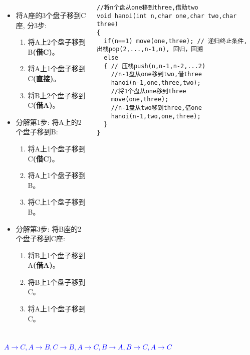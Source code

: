\begin{frame}%
\begin{columns}[T]
	\begin{itemize}
		\small
		\item 将A座的3个盘子移到C座, 分3步:
		\begin{enumerate}
			\scriptsize
			\item 将A上2个盘子移到B\textbf{(借C)}。
			\item 将A上1个盘子移到C\textbf{(直接)}。
			\item 将B上2个盘子移到C\textbf{(借A)}。
		\end{enumerate}
		\item 分解第1步: 将A上的2个盘子移到B:
		\begin{enumerate}\scriptsize
			\item 将A上1个盘子移到C\textbf{(借C)}。
			\item 将A上1个盘子移到B。
			\item 将C上1个盘子移到B。
		\end{enumerate}
		\item 分解第3步: 将B座的2个盘子移到C座:
		\begin{enumerate}\scriptsize
			\item 将B上1个盘子移到A\textbf{(借A)}。
			\item 将B上1个盘子移到C。
			\item 将A上1个盘子移到C。
		\end{enumerate}
	\end{itemize}
\begin{lstlisting}[frame=leftline]
//将n个盘从one移到three,借助two
void hanoi(int n,char one,char two,char three)
{
  if(n==1) move(one,three); // 递归终止条件, 出栈pop(2,...,n-1,n), 回归，回溯
  else
  { // 压栈push(n,n-1,n-2,...2)
    //n-1盘从one移到two,借three
    hanoi(n-1,one,three,two); 
    //将1个盘从one移到three
    move(one,three); 
    //n-1盘从two移到three,借one
    hanoi(n-1,two,one,three);
  }
}
\end{lstlisting}
\end{columns}
\textcolor{blue}{$A\to C,A\to B,C\to B,A\to C,B\to A,B\to C,A\to C$}\\
\end{frame}


